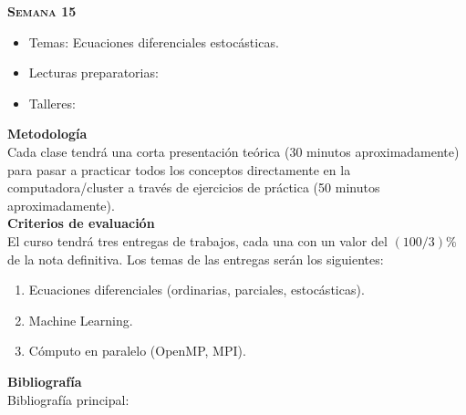 \documentclass[letterpaper,10pt,onecolumn]{article}
\begin{document}
\noindent\textbf{\textsc{Semana 15}}\\[-0.5cm]
\begin{itemize}
\item Temas: Ecuaciones diferenciales estoc\'asticas. \\[-0.6cm]
\item Lecturas preparatorias: \\[-0.6cm]
\item Talleres: \\[-0.6cm]
\end{itemize}

\noindent\textbf{\large {} \quad
  Metodolog\'ia}\\[-0.2cm] 


\noindent\normalsize Cada clase tendr\'a una corta presentaci\'on
te\'orica (30 minutos aproximadamente) para pasar a practicar todos
los conceptos directamente en la computadora/cluster a trav\'es de
ejercicios de pr\'actica (50 minutos aproximadamente). \\[0.1cm]


\noindent\textbf{\large {} \quad Criterios de
  evaluaci\'on}\\[-0.2cm] 


El curso tendr\'a tres entregas de trabajos, cada una con un valor
del $(100/3) \%$ de la nota definitiva. Los temas de las entregas ser\'an
los siguientes:
\begin{enumerate}
\item Ecuaciones diferenciales (ordinarias, parciales, estoc\'asticas).
\\[-0.6cm]
\item Machine Learning.
\\[-0.6cm]
\item C\'omputo en paralelo (OpenMP, MPI).
\\[-0.2cm]
\end{enumerate}


\noindent\textbf{\large {} \quad
  Bibliograf\'ia}\\[-0.2cm] 


\noindent\normalsize Bibliograf\'ia principal:
\end{document}
